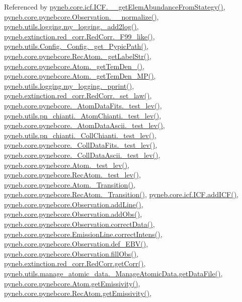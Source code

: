 Referenced by \hyperlink{icf_8py_source_l01075}{pyneb.\+core.\+icf.\+I\+C\+F.\+\_\+\+\_\+get\+Elem\+Abundance\+From\+Stategy()}, \hyperlink{pynebcore_8py_source_l03885}{pyneb.\+core.\+pynebcore.\+Observation.\+\_\+\+\_\+normalize()}, \hyperlink{logging_8py_source_l00059}{pyneb.\+utils.\+logging.\+my\+\_\+logging.\+\_\+add2log()}, \hyperlink{red__corr_8py_source_l00658}{pyneb.\+extinction.\+red\+\_\+corr.\+Red\+Corr.\+\_\+\+F99\+\_\+like()}, \hyperlink{_config_8py_source_l00086}{pyneb.\+utils.\+Config.\+\_\+\+Config.\+\_\+get\+\_\+\+Pypic\+Path()}, \hyperlink{pynebcore_8py_source_l02854}{pyneb.\+core.\+pynebcore.\+Rec\+Atom.\+\_\+get\+Label\+Str()}, \hyperlink{pynebcore_8py_source_l01803}{pyneb.\+core.\+pynebcore.\+Atom.\+\_\+get\+Tem\+Den\+\_()}, \hyperlink{pynebcore_8py_source_l01980}{pyneb.\+core.\+pynebcore.\+Atom.\+\_\+get\+Tem\+Den\+\_\+\+M\+P()}, \hyperlink{logging_8py_source_l00051}{pyneb.\+utils.\+logging.\+my\+\_\+logging.\+\_\+pprint()}, \hyperlink{red__corr_8py_source_l00176}{pyneb.\+extinction.\+red\+\_\+corr.\+Red\+Corr.\+\_\+set\+\_\+law()}, \hyperlink{pynebcore_8py_source_l00171}{pyneb.\+core.\+pynebcore.\+\_\+\+Atom\+Data\+Fits.\+\_\+test\+\_\+lev()}, \hyperlink{pn__chianti_8py_source_l00284}{pyneb.\+utils.\+pn\+\_\+chianti.\+\_\+\+Atom\+Chianti.\+\_\+test\+\_\+lev()}, \hyperlink{pynebcore_8py_source_l00435}{pyneb.\+core.\+pynebcore.\+\_\+\+Atom\+Data\+Ascii.\+\_\+test\+\_\+lev()}, \hyperlink{pn__chianti_8py_source_l00449}{pyneb.\+utils.\+pn\+\_\+chianti.\+\_\+\+Coll\+Chianti.\+\_\+test\+\_\+lev()}, \hyperlink{pynebcore_8py_source_l00660}{pyneb.\+core.\+pynebcore.\+\_\+\+Coll\+Data\+Fits.\+\_\+test\+\_\+lev()}, \hyperlink{pynebcore_8py_source_l01026}{pyneb.\+core.\+pynebcore.\+\_\+\+Coll\+Data\+Ascii.\+\_\+test\+\_\+lev()}, \hyperlink{pynebcore_8py_source_l01459}{pyneb.\+core.\+pynebcore.\+Atom.\+\_\+test\+\_\+lev()}, \hyperlink{pynebcore_8py_source_l02596}{pyneb.\+core.\+pynebcore.\+Rec\+Atom.\+\_\+test\+\_\+lev()}, \hyperlink{pynebcore_8py_source_l01367}{pyneb.\+core.\+pynebcore.\+Atom.\+\_\+\+Transition()}, \hyperlink{pynebcore_8py_source_l02696}{pyneb.\+core.\+pynebcore.\+Rec\+Atom.\+\_\+\+Transition()}, \hyperlink{icf_8py_source_l00797}{pyneb.\+core.\+icf.\+I\+C\+F.\+add\+I\+C\+F()}, \hyperlink{pynebcore_8py_source_l03436}{pyneb.\+core.\+pynebcore.\+Observation.\+add\+Line()}, \hyperlink{pynebcore_8py_source_l03467}{pyneb.\+core.\+pynebcore.\+Observation.\+add\+Obs()}, \hyperlink{pynebcore_8py_source_l03906}{pyneb.\+core.\+pynebcore.\+Observation.\+correct\+Data()}, \hyperlink{pynebcore_8py_source_l03325}{pyneb.\+core.\+pynebcore.\+Emission\+Line.\+correct\+Intens()}, \hyperlink{pynebcore_8py_source_l03861}{pyneb.\+core.\+pynebcore.\+Observation.\+def\+\_\+\+E\+B\+V()}, \hyperlink{pynebcore_8py_source_l03452}{pyneb.\+core.\+pynebcore.\+Observation.\+fill\+Obs()}, \hyperlink{red__corr_8py_source_l00211}{pyneb.\+extinction.\+red\+\_\+corr.\+Red\+Corr.\+get\+Corr()}, \hyperlink{manage__atomic__data_8py_source_l00297}{pyneb.\+utils.\+manage\+\_\+atomic\+\_\+data.\+\_\+\+Manage\+Atomic\+Data.\+get\+Data\+File()}, \hyperlink{pynebcore_8py_source_l01716}{pyneb.\+core.\+pynebcore.\+Atom.\+get\+Emissivity()}, \hyperlink{pynebcore_8py_source_l02873}{pyneb.\+core.\+pynebcore.\+Rec\+Atom.\+get\+Emissivity()}, 